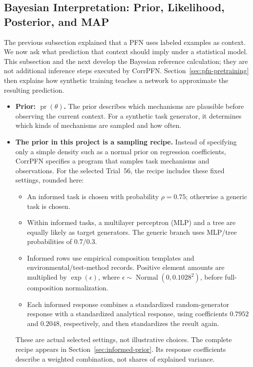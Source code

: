 \documentclass[11pt]{article}
\newcommand{\pr}{\operatorname{pr}}
\newenvironment{notes}
  {\begin{itemize}\setlength{\itemsep}{0.45em}\setlength{\parsep}{0pt}}
  {\end{itemize}}
\begin{document}
\subsection{Bayesian Interpretation: Prior, Likelihood, Posterior, and MAP}
\label{sec:bayesian-updating}

The previous subsection explained that a PFN uses labeled examples
as context. We now ask what prediction that context should imply
under a statistical model. This subsection and the next develop
the Bayesian reference calculation; they are not additional
inference steps executed by CorrPFN. Section~\ref{sec:pfn-pretraining}
then explains how synthetic training teaches a network to
approximate the resulting prediction.

\begin{notes}
    \item \textbf{Prior: \(\pr(\theta)\).} The prior describes which
    mechanisms are plausible before observing the current context.
    For a synthetic task generator, it determines which kinds of
    mechanisms are sampled and how often.

    \item \textbf{The prior in this project is a sampling recipe.}
    Instead of specifying only a simple density such as a normal
    prior on regression coefficients, CorrPFN specifies a program
    that samples task mechanisms and observations. For the selected
    Trial~56, the recipe includes these fixed settings, rounded here:
    \begin{notes}
        \item An informed task is chosen with probability
        \(\rho=0.75\); otherwise a generic task is chosen.
        \item Within informed tasks, a multilayer perceptron (MLP)
        and a tree are equally likely as target generators. The
        generic branch uses
        MLP/tree probabilities of \(0.7/0.3\).
        \item Informed rows use empirical composition templates
        and environmental/test-method records. Positive element
        amounts are multiplied by \(\exp(\epsilon)\), where
        \(\epsilon\sim\operatorname{Normal}(0,0.1028^2)\),
        before full-composition normalization.
        \item Each informed response combines a standardized
        random-generator response with a standardized analytical
        response, using coefficients \(0.7952\) and \(0.2048\),
        respectively, and then standardizes the result again.
    \end{notes}
    These are actual selected settings, not illustrative choices.
    The complete recipe appears in
    Section~\ref{sec:informed-prior}. Its response coefficients
    describe a weighted combination, not shares of explained variance.


\end{notes}
\end{document}
